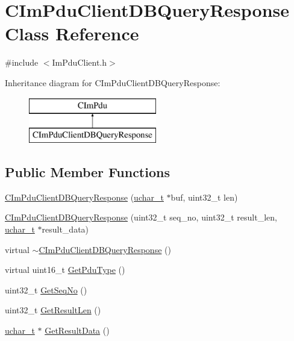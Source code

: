 \hypertarget{class_c_im_pdu_client_d_b_query_response}{}\section{C\+Im\+Pdu\+Client\+D\+B\+Query\+Response Class Reference}
\label{class_c_im_pdu_client_d_b_query_response}


{\ttfamily \#include $<$Im\+Pdu\+Client.\+h$>$}

Inheritance diagram for C\+Im\+Pdu\+Client\+D\+B\+Query\+Response\+:\begin{figure}[H]
\begin{center}
\leavevmode
\includegraphics[height=2.000000cm]{class_c_im_pdu_client_d_b_query_response}
\end{center}
\end{figure}
\subsection*{Public Member Functions}
\begin{DoxyCompactItemize}
\item 
\hyperlink{class_c_im_pdu_client_d_b_query_response_a4f6f031b67d7b3650a6e074594bdcc76}{C\+Im\+Pdu\+Client\+D\+B\+Query\+Response} (\hyperlink{base_2ostype_8h_a124ea0f8f4a23a0a286b5582137f0b8d}{uchar\+\_\+t} $\ast$buf, uint32\+\_\+t len)
\item 
\hyperlink{class_c_im_pdu_client_d_b_query_response_a2d11363e55e132657092777b645f86ae}{C\+Im\+Pdu\+Client\+D\+B\+Query\+Response} (uint32\+\_\+t seq\+\_\+no, uint32\+\_\+t result\+\_\+len, \hyperlink{base_2ostype_8h_a124ea0f8f4a23a0a286b5582137f0b8d}{uchar\+\_\+t} $\ast$result\+\_\+data)
\item 
virtual \hyperlink{class_c_im_pdu_client_d_b_query_response_a7bfad8ccd9dfe5930c36080daf158e16}{$\sim$\+C\+Im\+Pdu\+Client\+D\+B\+Query\+Response} ()
\item 
virtual uint16\+\_\+t \hyperlink{class_c_im_pdu_client_d_b_query_response_a3bec2cb515e0990c3f53dd7508c5f1eb}{Get\+Pdu\+Type} ()
\item 
uint32\+\_\+t \hyperlink{class_c_im_pdu_client_d_b_query_response_a0b71c7ace456de2c003c53fa9489a393}{Get\+Seq\+No} ()
\item 
uint32\+\_\+t \hyperlink{class_c_im_pdu_client_d_b_query_response_adc3c559d66b0bfd24150b9eaddadc622}{Get\+Result\+Len} ()
\item 
\hyperlink{base_2ostype_8h_a124ea0f8f4a23a0a286b5582137f0b8d}{uchar\+\_\+t} $\ast$ \hyperlink{class_c_im_pdu_client_d_b_query_response_ad2be5ef0d1b7ba0de1bfc293a2b33df7}{Get\+Result\+Data} ()
\end{DoxyCompactItemize}
